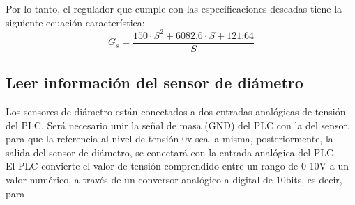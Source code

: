 Por lo tanto, el regulador que cumple con las especificaciones deseadas tiene la siguiente ecuación característica:
$$G_s = \frac{150 \cdot S^2 + 6082.6 \cdot S + 121.64}{S}$$

\subsection{Leer información del sensor de diámetro}
\label{sec:plc_diametro}

Los sensores de diámetro están conectados a dos entradas analógicas de tensión del PLC. Será necesario unir la señal de masa (GND) del PLC con la del sensor, para que la referencia al nivel de tensión 0v sea la misma, posteriormente, la salida del sensor de diámetro, se conectará con la entrada analógica del PLC.\\

El PLC convierte el valor de tensión comprendido entre un rango de 0-10V a un valor numérico, a través de un conversor analógico a digital de 10bits, es decir, para

